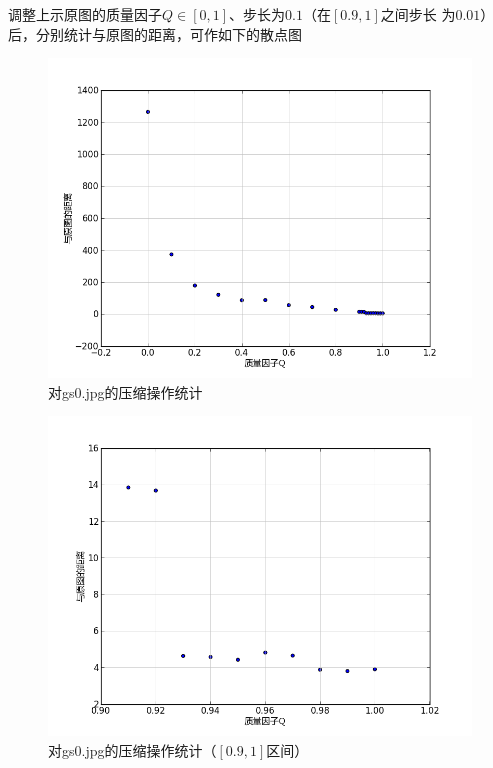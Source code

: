 调整上示原图的质量因子$Q \in [0, 1]$、步长为$0.1$（在$[0.9, 1]$之间步长
为$0.01$）后，分别统计与原图的距离，可作如下的散点图
\begin{figure}[H]
  \centering
  \includegraphics[keepaspectratio=true,
  scale=0.6]{images/quality_gs0.png}
  \caption{对gs0.jpg的压缩操作统计}
  \label{fig:quality-gs0-scatter-plot}
\end{figure}

\begin{figure}[H]
  \centering
  \includegraphics[keepaspectratio=true,
  scale=0.6]{images/quality_gs0_0.9_1.png}
  \caption{对gs0.jpg的压缩操作统计（$[0.9, 1]$区间）}
  \label{fig:quality-gs0-sub-scatter-plot}
\end{figure}

